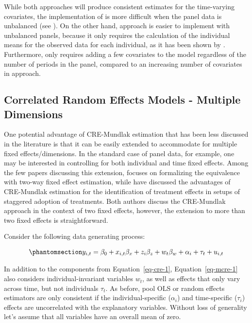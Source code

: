 \documentclass[bib]{statapress}
\begin{document}
While both approaches will produce consistent estimates for the
time-varying covariates, the implementation of
\citet{chamberlain1982multivariate} is more difficult when the panel
data is unbalanced (see \citet{abrevaya2013}). On the other hand,
\citet{mundlak1978pooling} approach is easier to implement with
unbalanced panels, because it only requires the calculation of the
individual means for the observed data for each individual, as it has
been shown by \citet{wooldridge2019}. Furthermore,
\citet{mundlak1978pooling} only requires adding a few covariates to the
model regardless of the number of periods in the panel, compared to an
increasing number of covariates in \citet{chamberlain1982multivariate}
approach.

\subsection{Correlated Random Effects Models - Multiple
Dimensions}\label{correlated-random-effects-models---multiple-dimensions}

One potential advantage of CRE-Mundlak estimation that has been less
discussed in the literature is that it can be easily extended to
accommodate for multiple fixed effects/dimensions. In the standard case
of panel data, for example, one may be interested in controlling for
both individual and time fixed effects. Among the few papers discussing
this extension, \citet{baltagi2023} focuses on formalizing the
equivalence with two-way fixed effect estimation, while
\citet{wooldridge2021} have discussed the advantages of CRE-Mundlak
estimation for the identification of treatment effects in setups of
staggered adoption of treatments. Both authors discuss the CRE-Mundlak
approach in the context of two fixed effects, however, the extension to
more than two fixed effects is straightforward.

Consider the following data generating process:

\begin{equation}\phantomsection\label{eq-mcre-1}{y_{i,t} = \beta_0 + x_{i,t}\beta_x + z_{i}\beta_z + w_{t}\beta_w + \alpha_i + \tau_t + u_{i,t}
}\end{equation}

In addition to the components from Equation~\ref{eq-cre-1},
Equation~\ref{eq-mcre-1} also considers individual-invariant variables
\(w_{t}\), as well as effects that only vary across time, but not
individuals \(\tau_t\). As before, pool OLS or random effects estimators
are only consistent if the individual-specific (\(\alpha_i\)) and
time-specific (\(\tau_i\)) effects are uncorrelated with the explanatory
variables. Without loss of generality let's assume that all variables
have an overall mean of zero.
\end{document}
